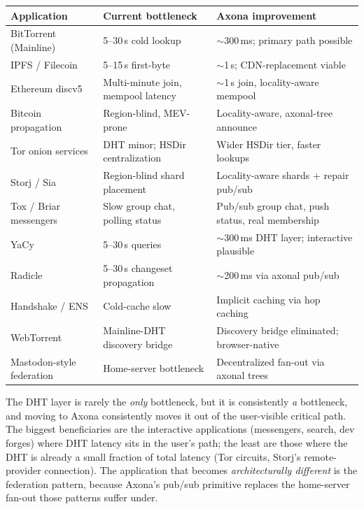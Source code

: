 \documentclass[nobib]{tufte-handout}
\begin{document}
\begin{fullwidth}
\par\medskip\noindent\small
\begin{tabular}{@{}p{}p{}p{}@{}}
\toprule
\textbf{Application} & \textbf{Current bottleneck} & \textbf{Axona improvement} \\
\midrule
BitTorrent (Mainline) & 5--30\,s cold lookup & $\sim$300\,ms; primary path possible \\
IPFS / Filecoin & 5--15\,s first-byte & $\sim$1\,s; CDN-replacement viable \\
Ethereum discv5 & Multi-minute join, mempool latency & $\sim$1\,s join, locality-aware mempool \\
Bitcoin propagation & Region-blind, MEV-prone & Locality-aware, axonal-tree announce \\
Tor onion services & DHT minor; HSDir centralization & Wider HSDir tier, faster lookups \\
Storj / Sia & Region-blind shard placement & Locality-aware shards + repair pub/sub \\
Tox / Briar messengers & Slow group chat, polling status & Pub/sub group chat, push status, real membership \\
YaCy & 5--30\,s queries & $\sim$300\,ms DHT layer; interactive plausible \\
Radicle & 5--30\,s changeset propagation & $\sim$200\,ms via axonal pub/sub \\
Handshake / ENS & Cold-cache slow & Implicit caching via hop caching \\
WebTorrent & Mainline-DHT discovery bridge & Discovery bridge eliminated; browser-native \\
Mastodon-style federation & Home-server bottleneck & Decentralized fan-out via axonal trees \\
\bottomrule
\end{tabular}
\par{}
\par\medskip
\end{fullwidth}

 The DHT layer is rarely the \emph{only}
bottleneck, but it is consistently \emph{a} bottleneck, and moving to
Axona consistently moves it out of the user-visible critical path. The
biggest beneficiaries are the interactive applications (messengers,
search, dev forges) where DHT latency sits in the user's path; the
least are those where the DHT is already a small fraction of total
latency (Tor circuits, Storj's remote-provider connection). The
application that becomes \emph{architecturally different} is the
federation pattern, because Axona's pub/sub primitive replaces the
home-server fan-out those patterns suffer under.
\end{document}

